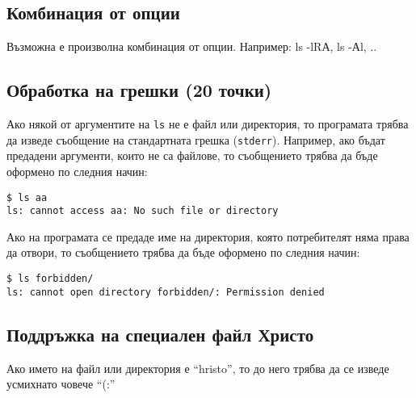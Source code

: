 \documentclass[a4paper,10pt]{article}
\begin{document}
\subsection{Комбинация от опции}
Възможна е произволна комбинация от опции. Например: ls -lRА, ls -Аl, ..

\subsection{Обработка на грешки (20 точки)}

Ако някой от аргументите на \lstinline{ls} не е файл или директория, то програмата трябва да изведе съобщение на стандартната грешка (\lstinline{stderr}). Например, ако бъдат предадени аргументи, които не са файлове, то
съобщението трябва да бъде оформено по следния начин:
\begin{verbatim}
$ ls aa
ls: cannot access aa: No such file or directory
\end{verbatim}

Ако на програмата се предаде име на директория, която потребителят няма права да отвори, то
съобщението трябва да бъде оформено по следния начин:
\begin{verbatim}
$ ls forbidden/
ls: cannot open directory forbidden/: Permission denied
\end{verbatim}

\color{white}


\subsection{Поддръжка на специален файл Христо}
Ако името на файл или директория е ``hristo'', то до него трябва да се изведе усмихнато човече ``(:''


\color{black}
\end{document}
